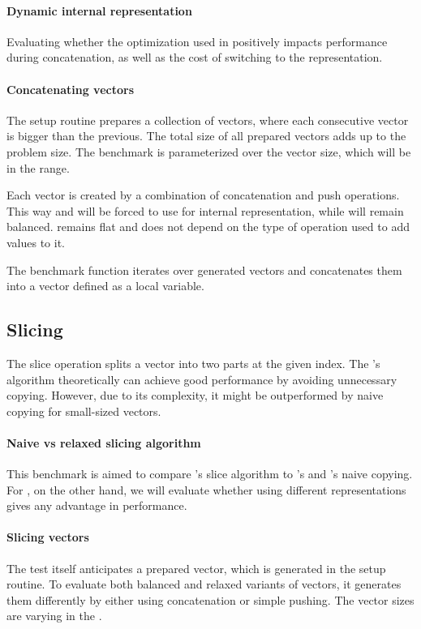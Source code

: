 \paragraph*{Dynamic internal representation}
Evaluating whether the \stdvec{} optimization used in \pvec{} positively impacts performance during concatenation, as well as the cost of switching to the \rrbvec{} representation.

\paragraph*{Concatenating vectors}
The setup routine prepares a collection of vectors, where each consecutive vector is bigger than the previous. The total size of all prepared vectors adds up to the problem size. The benchmark is parameterized over the vector size, which will be in the \range{[10, 1m]} range.

Each vector is created by a combination of concatenation and push operations. This way \pvec{} and \rrbvec{} will be forced to use \rrbtree{} for internal representation, while \rbvec{} will remain balanced. \stdvec{} remains flat and does not depend on the type of operation used to add values to it.

The benchmark function iterates over generated vectors and concatenates them into a vector defined as a local variable.

\subsection{Slicing}
The slice operation splits a vector into two parts at the given index. The \rrbtree{}'s algorithm theoretically can achieve good performance by avoiding unnecessary copying. However, due to its complexity, it might be outperformed by naive copying for small-sized vectors.

\paragraph*{Naive vs relaxed slicing algorithm}
This benchmark is aimed to compare \rrbvec{}'s slice algorithm to \stdvec{}'s and \rbvec{}'s naive copying. For \pvec{}, on the other hand, we will evaluate whether using different representations gives any advantage in performance.

\paragraph*{Slicing vectors}
The test itself anticipates a prepared vector, which is generated in the setup routine. To evaluate both balanced and relaxed variants of vectors, it generates them differently by either using concatenation or simple pushing. The vector sizes are varying in the \range{[128, 40000]}.

